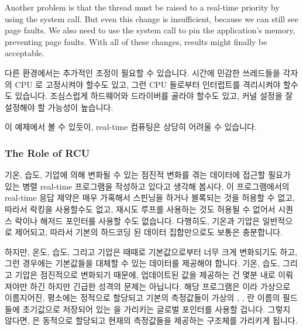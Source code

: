 Another problem is that the thread must be raised to a real-time
priority by using the  system call.
But even this change is insufficient, because we can still see
page faults.
We also need to use the  system call to pin the
application's memory, preventing page faults.
With all of these changes, results might finally be acceptable.
\fi

다른 환경에서는 추가적인 조정이 필요할 수 있습니다.
시간에 민감한 쓰레드들을 각자의 CPU 로 고정시켜야 할수도 있고, 그런 CPU
들로부터 인터럽트를 격리시켜야 할수도 있습니다.
조심스럽게 하드웨어와 드라이버를 골라야 할수도 있고, 커널 설정을 잘 설정해야 할
가능성이 높습니다.

이 예제에서 볼 수 있듯이, real-time 컴퓨팅은 상당히 어려울 수 있습니다.

\subsubsection{The Role of RCU}
\label{sec:advsync:The Role of RCU}

기온, 습도, 기압에 의해 변화될 수 있는 점진적 변화를 겪는 데이터에 접근할
필요가 있는 병렬 real-time 프로그램을 작성하고 있다고 생각해 봅시다.
이 프로그램에서의 real-time 응답 제약은 매우 가혹해서 스핀닝을 하거나 블록되는
것을 허용할 수 없고, 따라서 락킹을 사용할수도 없고, 재시도 루프를 사용하는 것도
허용될 수 없어서 시퀀스 락이나 해저드 포인터를 사용할 수도 없습니다.
다행히도, 기온과 기압은 일반적으로 제어되고, 따라서 기본의 하드코딩 된 데이터
집합만으로도 보통은 충분합니다.

하지만, 온도, 습도, 그리고 기압은 때때로 기본값으로부터 너무 크게 변화되기도
하고, 그런 경우에는 기본값들을 대체할 수 있는 데이터를 제공해야 합니다.
기온, 습도, 그리고 기압은 점진적으로 변화되기 때문에, 업데이트된 값을 제공하는
건 몇분 내로 이뤄져야만 하긴 하지만 긴급한 성격의 문제는 아닙니다.
해당 프로그램은  이라 가상으로 이름지어진, 평소에는 정적으로
할당되고 기본의 측정값들이 가상의 , ,  란 이름의 필드들에
초기값으로 저장되어 있는  을 가리키는 글로벌 포인터를 사용할
겁니다.
그렇지 않다면,  은 동적으로 할당되고 현재의 측정값들을 제공하는
구조체를 가리키게 됩니다.
\iffalse

